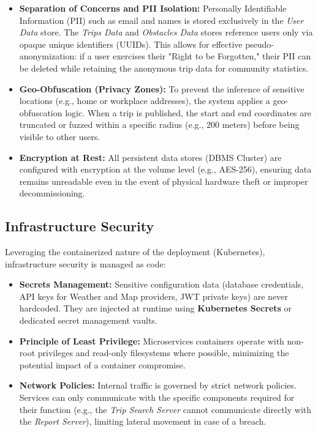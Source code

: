 \begin{itemize}
    \item \textbf{Separation of Concerns and PII Isolation:} Personally Identifiable Information (PII) such as email and names is stored exclusively in the \textit{User Data} store. The \textit{Trips Data} and \textit{Obstacles Data} stores reference users only via opaque unique identifiers (UUIDs). This allows for effective pseudo-anonymization: if a user exercises their "Right to be Forgotten," their PII can be deleted while retaining the anonymous trip data for community statistics.
    \item \textbf{Geo-Obfuscation (Privacy Zones):} To prevent the inference of sensitive locations (e.g., home or workplace addresses), the system applies a geo-obfuscation logic. When a trip is published, the start and end coordinates are truncated or fuzzed within a specific radius (e.g., 200 meters) before being visible to other users.
    \item \textbf{Encryption at Rest:} All persistent data stores (DBMS Cluster) are configured with encryption at the volume level (e.g., AES-256), ensuring data remains unreadable even in the event of physical hardware theft or improper decommissioning.
\end{itemize}
\subsection{Infrastructure Security}
Leveraging the containerized nature of the deployment (Kubernetes), infrastructure security is managed as code:

\begin{itemize}
    \item \textbf{Secrets Management:} Sensitive configuration data (database credentials, API keys for Weather and Map providers, JWT private keys) are never hardcoded. They are injected at runtime using \textbf{Kubernetes Secrets} or dedicated secret management vaults.
    \item \textbf{Principle of Least Privilege:} Microservices containers operate with non-root privileges and read-only filesystems where possible, minimizing the potential impact of a container compromise.
    \item \textbf{Network Policies:} Internal traffic is governed by strict network policies. Services can only communicate with the specific components required for their function (e.g., the \textit{Trip Search Server} cannot communicate directly with the \textit{Report Server}), limiting lateral movement in case of a breach.
\end{itemize}
